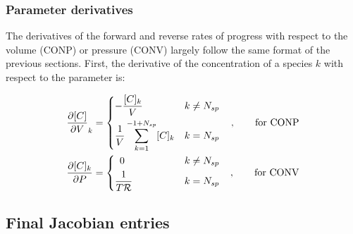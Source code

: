 \documentclass[12pt]{article}
\newcommand{\ns}{\ensuremath{{N_{sp}}}}
\newcommand{\conp}{CONP}
\newcommand{\conv}{CONV}
\newcommand{\dconp}{\ensuremath{,\qquad\text{for \conp}}}
\newcommand{\dconv}{\ensuremath{,\qquad\text{for \conv}}}
\newcommand{\Ru}{\ensuremath{\mathcal{R}}}
\begin{document}
\subsubsection{Parameter derivatives}
The derivatives of the forward and reverse rates of progress with respect to the volume (\conp) or pressure (\conv) largely follow the same format of the previous sections.
First, the derivative of the concentration of a species $k$ with respect to the parameter is:

\begin{subequations}
 \begin{align}
 \frac{\partial [C] }{\partial V }_{k} &=
 \begin{dcases}
  \mathrlap{-\frac{[C]_{k}}{V}}\hphantom{\frac{1}{V} \sum_{k=1}^{-1 + \ns} [C]_{k}} & k \ne \ns \\
  \frac{1}{V} \sum_{k=1}^{-1 + \ns} [C]_{k} & k = \ns
 \end{dcases}&\dconp \\
 \frac{\partial [C]_{k} }{\partial P } &=
 \begin{dcases}
  \mathrlap{\hphantom{0}0}\hphantom{\frac{1}{V} \sum_{k=1}^{-1 + \ns} [C]_{k}} & k \ne \ns \\
  \mathrlap{\frac{1}{T \Ru}}\hphantom{\frac{1}{V} \sum_{k=1}^{-1 + \ns} [C]_{k}} & k = \ns
 \end{dcases}&\dconv
 \end{align}
\end{subequations}


\subsection{Final Jacobian entries}
\label{s:jac_final}

\printbibliography 
\end{document}
